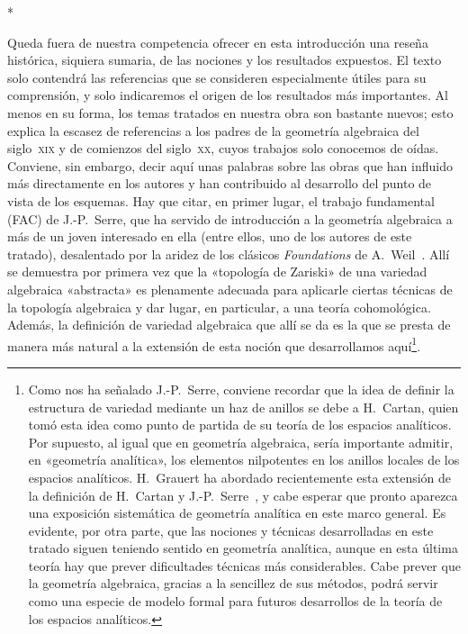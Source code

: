 \bigskip
\begin{center}*\quad*\quad*\end{center}
\bigskip

Queda fuera de nuestra competencia ofrecer en esta introducción una reseña histórica, siquiera sumaria, de las nociones y los resultados expuestos.
El texto solo contendrá las referencias que se consideren especialmente útiles para su comprensión, y solo indicaremos el origen de los resultados más importantes.
Al menos en su forma, los temas tratados en nuestra obra son bastante nuevos; esto explica la escasez de referencias a los padres de la geometría algebraica del siglo~\textsc{xix} y de comienzos del siglo~\textsc{xx}, cuyos trabajos solo conocemos de oídas.
Conviene, sin embargo, decir aquí unas palabras sobre las obras que han influido más directamente en los autores y han contribuido al desarrollo del punto de vista de los esquemas.
Hay que citar, en primer lugar, el trabajo fundamental (FAC) de J.-P.~Serre, que ha servido de introducción a la geometría algebraica a más de un joven interesado en ella (entre ellos, uno de los autores de este tratado), desalentado por la aridez de los clásicos \emph{Foundations} de A.~Weil~\cite{I-18}.
Allí se demuestra por primera vez que la «topología de Zariski» de una variedad algebraica «abstracta» es plenamente adecuada para aplicarle ciertas técnicas de la topología algebraica y dar lugar, en particular, a una teoría cohomológica.
Además, la definición de variedad algebraica que allí se da es la que se presta de manera más natural a la extensión de esta noción que desarrollamos aquí\footnote{Como nos ha señalado J.-P.~Serre, conviene recordar que la idea de definir la estructura de variedad mediante un haz de anillos se debe a H.~Cartan, quien tomó esta idea como punto de partida de su teoría de los espacios analíticos.
Por supuesto, al igual que en geometría algebraica, sería importante admitir, en «geometría analítica», los elementos nilpotentes en los anillos locales de los espacios analíticos.
H.~Grauert ha abordado recientemente esta extensión de la definición de H.~Cartan y J.-P.~Serre~\cite{I-5}, y cabe esperar que pronto aparezca una exposición sistemática de geometría analítica en este marco general.
Es evidente, por otra parte, que las nociones y técnicas desarrolladas en este tratado siguen teniendo sentido en geometría analítica, aunque en esta última teoría hay que prever dificultades técnicas más considerables.
Cabe prever que la geometría algebraica, gracias a la sencillez de sus métodos, podrá servir como una especie de modelo formal para futuros desarrollos de la teoría de los espacios analíticos.}.

